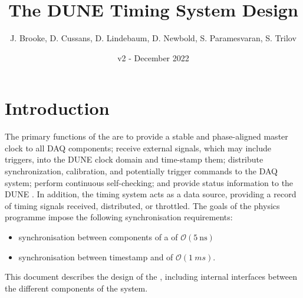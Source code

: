 \documentclass{dune}
\title{The DUNE Timing System  Design}
\author{J. Brooke, D. Cussans, D. Lindebaum, D. Newbold, S. Paramesvaran, S. Trilov}
\date{v2 - December 2022}
\begin{document}
\linenumbers
\maketitle

\tableofcontents

%

\section{Introduction}
\label{sec:intro}
The primary functions of the  are to provide a stable and phase-aligned master clock to all DAQ components; receive external signals, which may include triggers, into the DUNE clock domain and time-stamp them; distribute synchronization, calibration, and potentially trigger commands to the DAQ system; perform continuous self-checking; and provide status information to the DUNE . In addition, the timing system acts as a data source, providing a record of timing signals received, distributed, or throttled. The goals of the  physics programme impose the following synchronisation requirements:

\begin{itemize}
    \item synchronisation between components of a  of $\mathcal{O}(\SI{5}{\ns})$
    \item synchronisation between  timestamp and  of $\mathcal{O}(\SI{1}{ms})$.
\end{itemize}


This document describes the design of the , including internal interfaces between the different components of the system. 
\end{document}
